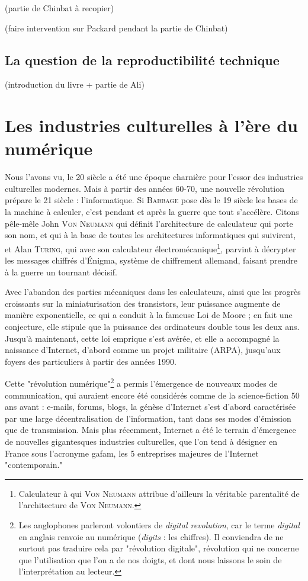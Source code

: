 \documentclass[a4paper,12pt]{report}
\begin{document}
(partie de Chinbat à recopier) 

(faire intervention sur Packard pendant la partie de Chinbat)

\subsection{La question de la reproductibilité technique}

(introduction du livre + partie de Ali)

\section{Les industries culturelles à l'ère du numérique}

Nous l'avons vu, le 20 siècle a été une époque charnière pour l'essor des industries culturelles modernes. Mais à partir des années 60-70, une nouvelle révolution prépare le 21 siècle : l'informatique. Si \textsc{Babbage} pose dès le 19 siècle les bases de la machine à calculer, c'est pendant et après la guerre que tout s'accélère. Citons pêle-mêle John \textsc{Von Neumann} qui définit l'architecture de calculateur qui porte son nom, et qui à la base de toutes les architectures informatiques qui suivirent, et Alan \textsc{Turing}, qui avec son calculateur électromécanique\footnote{Calculateur à qui \textsc{Von Neumann} attribue d'ailleurs la véritable parentalité de l'architecture de \textsc{Von Neumann}.}, parvint à décrypter les messages chiffrés d'Énigma, système de chiffrement allemand, faisant prendre à la guerre un tournant décisif.

Avec l'abandon des parties mécaniques dans les calculateurs, ainsi que les progrès croissants sur la miniaturisation des transistors, leur puissance augmente de manière exponentielle, ce qui a conduit à la fameuse Loi de Moore ; en fait une conjecture, elle stipule que la puissance des ordinateurs double tous les deux ans. Jusqu'à maintenant, cette loi emprique s'est avérée, et elle a accompagné la naissance d'Internet, d'abord comme un projet militaire (ARPA), jusqu'aux foyers des particuliers à partir des années 1990.

Cette "révolution numérique"\footnote{Les anglophones parleront volontiers de \textit{digital revolution}, car le terme \textit{digital} en anglais renvoie au numérique (\textit{digits} : les chiffres). Il conviendra de ne surtout pas traduire cela par "révolution digitale", révolution qui ne concerne que l'utilisation que l'on a de nos doigts, et dont nous laissons le soin de l'interprétation au lecteur.} a permis l'émergence de nouveaux modes de communication, qui auraient encore été considérés comme de la science-fiction 50 ans avant : e-mails, forums, blogs, la génèse d'Internet s'est d'abord caractérisée par une large décentralisation de l'information, tant dans ses modes d'émission que de transmission. Mais plus récemment, Internet a été le terrain d'émergence de nouvelles gigantesques industries culturelles, que l'on tend à désigner en France sous l'acronyme \gls{gafam}, les 5 entreprises majeures de l'Internet "contemporain."
\end{document}
